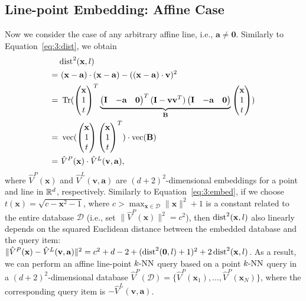 \subsection{Line-point Embedding: Affine Case}
Now we consider the case of any arbitrary affine line, i.e., $\mathbf a \neq \mathbf 0$. Similarly to Equation~\ref{eq:3:dist}, we obtain
\begin{align}
  \label{eq:3:dist2}
   & \operatorname{dist}^2(\mathbf x, l) \notag \\
  =& \ (\mathbf x - \mathbf a) \cdot (\mathbf x - \mathbf a) - ((\mathbf x - \mathbf a) \cdot \mathbf v)^2 \notag  \\
  =& \ \operatorname{Tr}(\begin{pmatrix} \mathbf x \\ 1 \\ t \end{pmatrix} ^T \underbrace{\begin{pmatrix} \mathbf I & - \mathbf a & \mathbf 0 \end{pmatrix}^T (\mathbf I - \mathbf v \mathbf v^T) \begin{pmatrix} \mathbf I & -\mathbf a & \mathbf 0 \end{pmatrix}}_{\mathbf B} \begin{pmatrix} \mathbf x \\ 1 \\ t \end{pmatrix}) \notag \\
  =& \ \operatorname{vec}(\begin{pmatrix} \mathbf x \\ 1 \\ t \end{pmatrix} \begin{pmatrix} \mathbf x \\ 1 \\ t \end{pmatrix}^T) \cdot \operatorname{vec}(\mathbf B) \\
  =& \ \hat{V}^P(\mathbf x) \cdot \hat{V}^L(\mathbf v, \mathbf a), \notag
\end{align}
where $\hat{V}^P(\mathbf x)$ and $\hat{V}^L(\mathbf v, \mathbf a)$ are $(d+2)^2$-dimensional embeddings for a point and line in $\mathbb R^d$, respectively. Similarly to Equation~\ref{eq:3:embed}, if we choose $t(\mathbf x) = \sqrt{c - \mathbf x^2 - 1}$, where $c > \max_{\mathbf x \in \mathcal D} \|\mathbf x\|^2 + 1$ is a constant related to the entire database $\mathcal D$ (i.e., set $\|\hat{V}^P(\mathbf x)\|^2 = c^2$), then $\operatorname{dist}^2(\mathbf x, l)$ also linearly depends on the squared Euclidean distance between the embedded database and the query item: $\|\hat{V}^P(\mathbf x) - \hat{V}^L(\mathbf v, \mathbf a)\|^2 = c^2 + d - 2 + (\operatorname{dist}^2(\mathbf 0, l) + 1)^2 + 2 \operatorname{dist}^2(\mathbf x, l)$. As a result, we can perform an affine line-point $k\text{-NN}$ query based on a point $k\text{-NN}$ query in a $(d+2)^2$-dimensional database $\hat{V}^P(\mathcal D) = \{\hat{V}^P(\mathbf x_1), ..., \hat{V}^P(\mathbf x_N) \}$, where the corresponding query item is $-\hat{V}^L(\mathbf v, \mathbf a)$.

